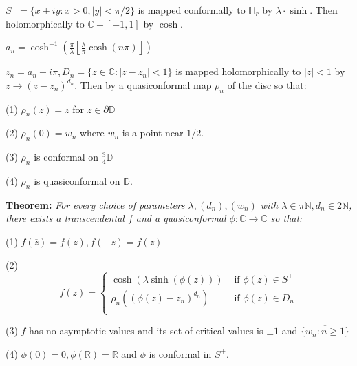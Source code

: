 \documentclass{beamer}
\begin{document}
\begin{frame} 

{\tiny $S^+ = \{ x + iy : x > 0, |y| < \pi/2 \}$ is mapped conformally to $\mathbb{H}_r$ by $\lambda\cdot\sinh$. Then holomorphically to $\mathbb{C} - [-1,1]$ by $\cosh$.

\vspace{1.25mm}

$a_n = \cosh^{-1}\left( \frac{\pi}{\lambda} \left \lfloor{ \frac{\lambda}{\pi} \cosh(n\pi) }\right \rfloor \right)$

\vspace{1.25mm}

$z_n = a_n + i\pi, D_n = \{ z \in \mathbb{C} : \left| z - z_n \right| < 1\} $ is mapped holomorphically to $|z|<1$ by $z\rightarrow (z - z_n)^{d_n}$. Then by a quasiconformal map $\rho_n$ of the disc so that: 

\hspace{5mm} (1) $\rho_n(z)=z$ for $z\in\partial\mathbb{D}$

\hspace{5mm} (2) $\rho_n(0)=w_n$ where $w_n$ is a point near $1/2$.

\hspace{5mm} (3) $\rho_n$ is conformal on $\frac{3}{4}\mathbb{D}$

\hspace{5mm} (4) $\rho_n$ is quasiconformal on $\mathbb{D}$.  

}

\vspace{5mm}

{\bf Theorem:}  {\it For every choice of parameters $\lambda, (d_n), (w_n)$ with $\lambda \in \pi\mathbb{N}, d_n \in 2\mathbb{N}$, there exists a transcendental $f$ and a quasiconformal $\phi: \mathbb{C}\rightarrow\mathbb{C}$ so that:}

\hspace{5mm} (1) $f(\overline{z}) = \overline{f(z)}, f(-z)=f(z)$

\hspace{5mm} (2) \[ f(z) = \begin{cases} 
      \cosh(\lambda\sinh(\phi(z))) & \textrm{ if } \phi(z)\in S^+ \\
      \rho_n((\phi(z)-z_n)^{d_n}) & \textrm{ if } \phi(z)\in D_n \\
   \end{cases} \]
   
\hspace{5mm} (3) $f$ has no asymptotic values and its set of critical values is $\pm1$ and $\overline{\{w_n: n \geq 1\}}$

\hspace{5mm} (4) $\phi(0)=0, \phi(\mathbb{R})=\mathbb{R}$ and $\phi$ is conformal in $S^+$.


\end{frame}
\end{document}
